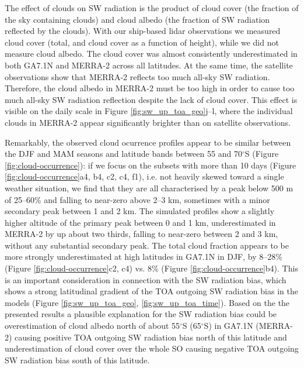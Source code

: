 The effect of clouds on SW radiation is the product of cloud cover (the
fraction of the sky containing clouds) and cloud albedo (the fraction of SW
radiation reflected by the clouds). With our ship-based lidar observations we
measured cloud cover (total, and cloud cover as a function of height), while we
did not measure cloud albedo. The cloud cover was almost consistently
underestimated in both GA7.1N and MERRA-2 across all latitudes. At the same
time, the satellite observations show that MERRA-2 reflects too much all-sky SW
radiation. Therefore, the cloud albedo in MERRA-2 must be too high in order to
cause too much all-sky SW radiation reflection despite the lack of cloud cover.
This effect is visible on the daily scale in Figure
\ref{fig:sw_up_toa_geo}j--l, where the individual clouds in MERRA-2 appear
significantly brighter than on satellite observations.

Remarkably, the observed cloud ocurrence profiles appear
to be similar between the DJF and MAM seasons and
latitude bands between 55 and 70$^\circ$S (Figure \ref{fig:cloud-occurrence}):
if we focus on the subsets with more than 10 days (Figure \ref{fig:cloud-occurrence}a4, b4, c2, c4, f1),
i.e. not heavily skewed toward a single weather situation,
we find that they are
all characterised by a peak below 500 m of 25--60\% and falling to near-zero
above 2--3 km, sometimes with a minor secondary peak between 1 and 2 km.
The simulated profiles show a slightly higher altitude of the primary peak
between 0 and 1 km, underestimated in MERRA-2 by up about two thirds,
falling to near-zero between 2 and 3 km, without any substantial secondary peak.
The total cloud fraction appears to be more strongly underestimated at high
latitudes in GA7.1N in DJF, by 8--28\% (Figure \ref{fig:cloud-occurrence}c2, c4)
vs. 8\% (Figure \ref{fig:cloud-occurrence}b4).
This is an important consideration in connection with the SW radiation bias, which shows a strong
latitudinal gradient of the TOA outgoing SW radiation bias in the models
(Figure \ref{fig:sw_up_toa_geo}, \ref{fig:sw_up_toa_time}). Based on the the
presented results a plausible explanation for the SW radiation bias could be
overestimation of cloud albedo north of about 55$^\circ$S (65$^\circ$S) in
GA7.1N (MERRA-2) causing positive TOA outgoing SW radiation bias north of this
latitude and underestimation of cloud cover over the whole SO causing negative
TOA outgoing SW radiation bias south of this latitude.

